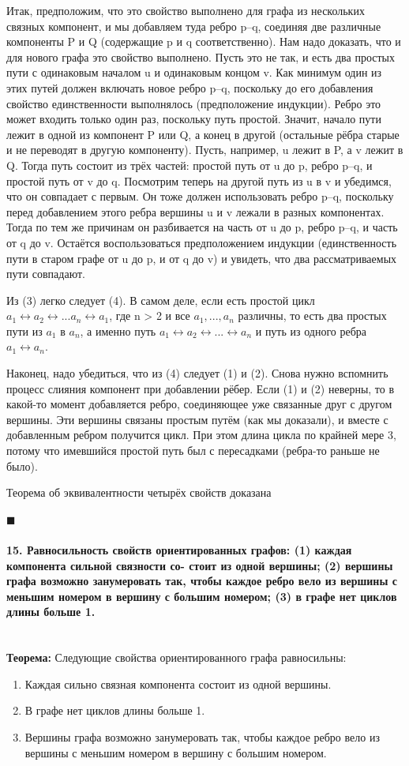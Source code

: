 \documentclass[a4paper, 12pt]{article}
\newcommand{\parag}[1]{\paragraph{#1}\mbox{}\\}
\begin{document}
\noindent
Итак, предположим, что это свойство выполнено для графа из нескольких связных компонент, и мы добавляем туда ребро p–q, соединяя две различные компоненты P и Q (содержащие p и q соответственно). Нам надо доказать, что и для нового графа это свойство выполнено. Пусть это не так, и есть два простых пути с одинаковым началом u и одинаковым концом v. Как минимум один из этих путей должен включать новое ребро p–q, поскольку до его добавления свойство единственности выполнялось (предположение индукции). Ребро это может входить только один раз, поскольку путь простой. Значит, начало пути лежит в одной из компонент P или Q, а конец в другой (остальные рёбра старые и не переводят в другую компоненту). Пусть, например, u лежит в P, а v лежит в Q. Тогда путь состоит из трёх частей: простой путь от u до p, ребро p–q, и простой путь от v до q. Посмотрим теперь на другой путь из u в v и убедимся, что он совпадает с первым. Он тоже должен использовать ребро p–q, поскольку перед добавлением этого ребра вершины u и v лежали в разных компонентах. Тогда по тем же причинам он разбивается на часть от u до p, ребро p–q, и часть от q до v. Остаётся воспользоваться предположением индукции (единственность пути в старом графе от u до p, и от q до v) и увидеть, что два рассматриваемых пути совпадают.

\noindent
Из (3) легко следует (4). В самом деле, если есть простой цикл $a_{1} \leftrightarrow a_{2} \leftrightarrow ...  a_{n} \leftrightarrow a_{1}$, где n > 2 и все $a_{1}, ..., a_{n}$ различны, то есть два простых пути из $a_{1}$ в $a_{n}$, а именно путь $a_{1} \leftrightarrow a_{2} \leftrightarrow ... \leftrightarrow a_{n}$ и путь из одного ребра $a_{1} \leftrightarrow a_{n}$.

\noindent
Наконец, надо убедиться, что из (4) следует (1) и (2). Снова нужно вспомнить процесс слияния компонент при добавлении рёбер. Если (1) и (2) неверны, то в какой-то момент добавляется ребро, соединяющее уже связанные друг с другом вершины. Эти вершины связаны простым путём (как мы доказали), и вместе с добавленным ребром получится цикл. При этом длина цикла по крайней мере 3, потому что имевшийся простой путь был с пересадками (ребра-то раньше не было).

\noindent
Теорема об эквивалентности четырёх свойств доказана

\noindent
$\blacksquare$

\parag{15. Равносильность свойств ориентированных графов: (1) каждая компонента сильной связности со- стоит из одной вершины; (2) вершины графа возможно занумеровать так, чтобы каждое ребро вело из вершины с меньшим номером в вершину с большим номером; (3) в графе нет циклов длины больше 1.}
\textbf{Теорема: } Следующие свойства ориентированного графа равносильны:
\begin{enumerate}
    \item Каждая сильно связная компонента состоит из одной вершины.
    \item В графе нет циклов длины больше 1.
    \item Вершины графа возможно занумеровать так, чтобы каждое ребро вело из вершины с меньшим номером в вершину с большим номером.
\end{enumerate}
\end{document}
